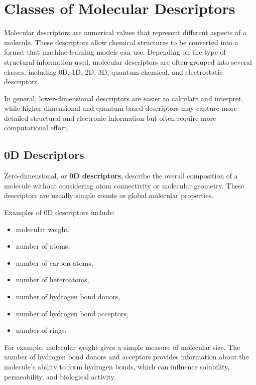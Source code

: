 \documentclass[11pt]{report}
\newenvironment{Important note}{\begin{quote}\color{red}\textbf{Important note:} }{\end{quote}}
\begin{document}
\section{Classes of Molecular Descriptors}

Molecular descriptors are numerical values that represent different aspects of a molecule. These descriptors allow chemical structures to be converted into a format that machine-learning models can use. Depending on the type of structural information used, molecular descriptors are often grouped into several classes, including 0D, 1D, 2D, 3D, quantum chemical, and electrostatic descriptors.

In general, lower-dimensional descriptors are easier to calculate and interpret, while higher-dimensional and quantum-based descriptors may capture more detailed structural and electronic information but often require more computational effort.

\subsection{0D Descriptors}

Zero-dimensional, or \textbf{0D descriptors}, describe the overall composition of a molecule without considering atom connectivity or molecular geometry. These descriptors are usually simple counts or global molecular properties.

Examples of 0D descriptors include:

\begin{itemize}[leftmargin=*]
    \item molecular weight,
    \item number of atoms,
    \item number of carbon atoms,
    \item number of heteroatoms,
    \item number of hydrogen bond donors,
    \item number of hydrogen bond acceptors,
    \item number of rings.
\end{itemize}

For example, molecular weight gives a simple measure of molecular size. The number of hydrogen bond donors and acceptors provides information about the molecule's ability to form hydrogen bonds, which can influence solubility, permeability, and biological activity.
\end{document}

